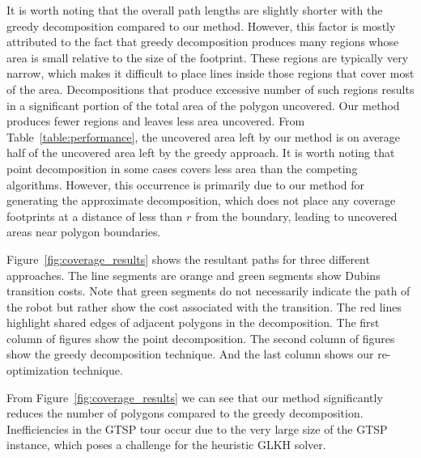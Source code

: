 \documentclass[../main.tex]{subfiles}
\begin{document}
It is worth noting that the overall path lengths are slightly shorter with the greedy decomposition compared to our method. However, this factor is mostly attributed to the fact that greedy decomposition produces many regions whose area is small relative to the size of the footprint. These regions are typically very narrow, which makes it difficult to place lines inside those regions that cover most of the area. Decompositions that produce excessive number of such regions results in a significant portion of the total area of the polygon uncovered. Our method produces fewer regions and leaves less area uncovered. From Table~\ref{table:performance}, the uncovered area left by our method is on average half of the uncovered area left by the greedy approach. It is worth noting that point decomposition in some cases covers less area than the competing algorithms. However, this occurrence is primarily due to our method for generating the approximate decomposition, which does not place any coverage footprints at a distance of less than $r$ from the boundary, leading to uncovered areas near polygon boundaries.

Figure~\ref{fig:coverage_results} shows the resultant paths for three different approaches. The line segments are orange and green segments show Dubins transition costs. Note that green segments do not necessarily indicate the path of the robot but rather show the cost associated with the transition. The red lines highlight shared edges of adjacent polygons in the decomposition. The first column of figures show the point decomposition. The second column of figures show the greedy decomposition technique. And the last column shows our re-optimization technique. 

From Figure~\ref{fig:coverage_results} we can see that our method significantly reduces the number of polygons compared to the greedy decomposition. Inefficiencies in the GTSP tour occur due to the very large size of the GTSP instance, which poses a challenge for the heuristic GLKH solver.

\begin{figure*}
		\centering
%
%
%
	\caption{First column: point decomposition. Second columm: greedy decomposition. Third column: min altitude decomposition.}
	\label{fig:coverage_results}
\end{figure*}

%	
%	
\end{document}
